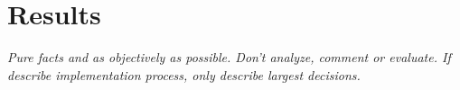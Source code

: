 \chapter{Results}\label{cha:Results}

\textit{Pure facts and as objectively as possible. Don't analyze, comment or evaluate.  If describe implementation process, only describe largest decisions.}


\newpage


\newpage


\newpage


\newpage


\newpage


\newpage


\newpage

